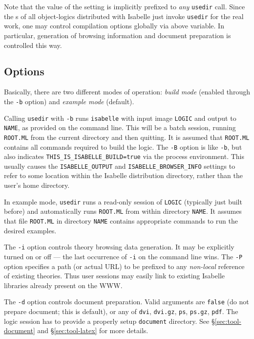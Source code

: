 Note that the value of the  setting is
implicitly prefixed to \emph{any} \texttt{usedir} call. Since the
s of all object-logics distributed with Isabelle just
invoke \texttt{usedir} for the real work, one may control compilation options
globally via above variable. In particular, generation of 
browsing information and document preparation is controlled this way.


\subsection*{Options}

Basically, there are two different modes of operation: \emph{build
  mode} (enabled through the \texttt{-b} option) and \emph{example
  mode} (default).

Calling \texttt{usedir} with \texttt{-b} runs \texttt{isabelle} with input
image \texttt{LOGIC} and output to \texttt{NAME}, as provided on the command
line. This will be a batch session, running \texttt{ROOT.ML} from the current
directory and then quitting.  It is assumed that \texttt{ROOT.ML} contains all
{\ML} commands required to build the logic.  The \texttt{-B} option is like
\texttt{-b}, but also indicates \texttt{THIS_IS_ISABELLE_BUILD=true} via the
process environment.  This usually causes the \texttt{ISABELLE\_OUTPUT} and
\texttt{ISABELLE_BROWSER_INFO} settings to refer to some location within the
Isabelle distribution directory, rather than the user's home directory.

In example mode, \texttt{usedir} runs a read-only session of \texttt{LOGIC}
(typically just built before) and automatically runs \texttt{ROOT.ML} from
within directory \texttt{NAME}.  It assumes that file \texttt{ROOT.ML} in
directory \texttt{NAME} contains appropriate {\ML} commands to run the desired
examples.

\medskip The \texttt{-i} option controls theory browsing data generation. It
may be explicitly turned on or off --- the last occurrence of \texttt{-i} on
the command line wins.  The \texttt{-P} option specifies a path (or actual
URL) to be prefixed to any \emph{non-local} reference of existing theories.
Thus user sessions may easily link to existing Isabelle libraries already
present on the WWW.

\medskip The \texttt{-d} option controls document preparation.  Valid
arguments are \texttt{false} (do not prepare document; this is default), or
any of \texttt{dvi}, \texttt{dvi.gz}, \texttt{ps}, \texttt{ps.gz},
\texttt{pdf}.  The logic session has to provide a properly setup
\texttt{document} directory.  See \S\ref{sec:tool-document} and
\S\ref{sec:tool-latex} for more details.

